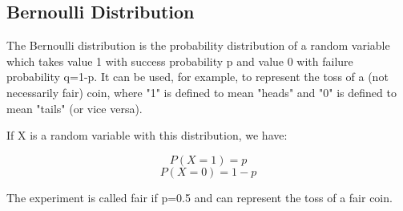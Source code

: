 \subsection{Bernoulli Distribution}

The Bernoulli distribution is the probability distribution of a random variable which takes value 1 with success probability p and value 0 with failure 
probability q=1-p. It can be used, for example, to represent the toss of a (not necessarily fair) coin, where "1" is defined to mean "heads" and "0" is 
defined to mean "tails" (or vice versa).

If X is a random variable with this distribution, we have:

\[P(X=1) = p\]
\[P(X=0) = 1-p\]

The experiment is called fair if p=0.5 and can represent the toss of a fair coin. 
















